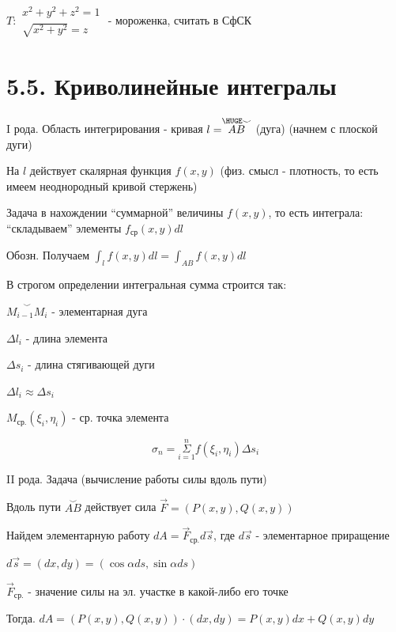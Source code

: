\documentclass[12pt]{article}
\begin{document}
    \Lab $T: \begin{matrix}x^2 + y^2 + z^2 = 1 \\ \sqrt{x^2 + y^2} = z\end{matrix}$ - мороженка, считать в СфСК


    \section{5.5. Криволинейные интегралы}

    I рода. Область интегрирования - кривая $l = \stackrel{\HUGE\smile}{AB}$ (дуга) (начнем с плоской дуги)

    На $l$ действует скалярная функция $f(x, y)$ (физ. смысл - плотность, то есть имеем неоднородный кривой стержень)

    Задача в нахождении \enquote{суммарной} величины $f(x, y)$, то есть интеграла: \enquote{складываем} элементы $f_{\text{ср}}(x, y) dl$


    Обозн. Получаем $\int_l f(x, y)dl = \int_{AB} f(x, y)dl$



    \Nota В строгом определении интегральная сумма строится так:

    $\overset{\smile}{M_{i-1}M_i}$ - элементарная дуга

    $\Delta l_i$ - длина элемента

    $\Delta s_i$ - длина стягивающей дуги

    $\Delta l_i \approx \Delta s_i$

    $M_{\text{ср.}}(\xi_i, \eta_i)$ - ср. точка элемента

    \[\sigma_n = \overset{n}{\underset{i = 1}{\Sigma}} f(\xi_i, \eta_i) \Delta s_i\]

    \vspace{10mm}

    II рода. Задача (вычисление работы силы вдоль пути)

    Вдоль пути $\overset{\smile}{AB}$ действует сила $\overrightarrow{F} = (P(x, y), Q(x, y))$

    Найдем элементарную работу $dA = \overrightarrow{F}_{\text{ср.}} d\overrightarrow{s}$, где $d\overrightarrow{s}$ - элементарное приращение

    $d\overrightarrow{s} = (dx, dy) = (\cos\alpha ds, \sin\alpha ds)$

    $\overrightarrow{F}_{\text{ср.}}$ - значение силы на эл. участке в какой-либо его точке

    Тогда. $dA = (P(x, y), Q(x, y)) \cdot (dx, dy) = P(x, y)dx + Q(x, y)dy$
\end{document}
